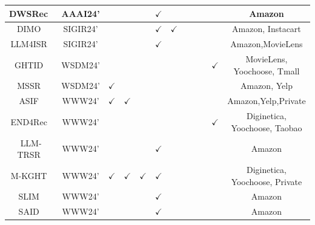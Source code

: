 \documentclass[lettersize,journal]{IEEEtran}
\begin{document}
\begin{table}[!th]
\begin{tabular}{c|c|c|c|    c|c|c|c|    c|c|c|c}
 {DWSRec~\cite{Zhang@AAAI2024}}    & {AAAI24'}    &{}    & {}   & {}   & {$\checkmark$}  & {}   & {}  & {}  & {}  & {}    & {Amazon} \\
 \hline
 {DIMO~\cite{DIMO}}    & {SIGIR24'}    &{}    & {}   & {}   & {$\checkmark$}  & {$\checkmark$}  & {}   & {}  & {}  & {}    & {Amazon, Instacart} \\
 \hline
 {LLM4ISR~\cite{Sun@SIGIR2024}}    & {SIGIR24'}    &{}    & {}   & {}   & {$\checkmark$}  & {}   & {}  & {}  & {}  & {}    & {Amazon,MovieLens} \\
 \hline
 {GHTID~\cite{Li@WSDM2024}}    & {WSDM24'}    &{}    & {}   & {}   & {}  & {}   & {}  & {}  & {}  & {$\checkmark$}    & {MovieLens, Yoochoose, Tmall} \\  
 \hline
 {MSSR~\cite{Lin@WSDM2024}}    & {WSDM24'}    &{$\checkmark$}    & {}   & {}   & {}  & {}   & {}  & {}  & {}  & {}    & {Amazon, Yelp} \\  
 \hline
 {ASIF~\cite{WangS@WWW2024}}    & {WWW24'}    &{$\checkmark$}    & {$\checkmark$}   & {}   & {}  & {}   & {}  & {}  & {}  & {}    & {Amazon,Yelp,Private} \\  
 \hline
 {END4Rec~\cite{Han@WWW2024}}    & {WWW24'}    &{}    & {}   & {}   & {}  & {}   & {}  & {}  & {}  & {$\checkmark$}    & {Diginetica, Yoochoose, Taobao} \\  
 \hline
 {LLM-TRSR~\cite{Zheng@WWW2024}}    & {WWW24'}    &{}    & {}   & {}   & {$\checkmark$}  & {}   & {}  & {}  & {}  & {}    & {Amazon} \\
 \hline
 {M-KGHT~\cite{Wang@WWW2024}}    & {WWW24'}    &{$\checkmark$}    & {$\checkmark$}   & {$\checkmark$}   & {$\checkmark$}  & {}   & {}  & {}  & {}  & {}    & {Diginetica, Yoochoose, Private} \\
 \hline
 {SLIM~\cite{Wang@WWW2024LLM}}    & {WWW24'}    &{}    & {}   & {}   & {$\checkmark$}  & {}   & {}  & {}  & {}  & {}    & {Amazon} \\
 \hline
 {SAID~\cite{Hu@WWW2024}}    & {WWW24'}    &{}    & {}   & {}   & {$\checkmark$}  & {}   & {}  & {}  & {}  & {}    & {Amazon} \\
 
 
 

\bottomrule
\end{tabular}
\label{approach}
\end{table}
\end{document}
